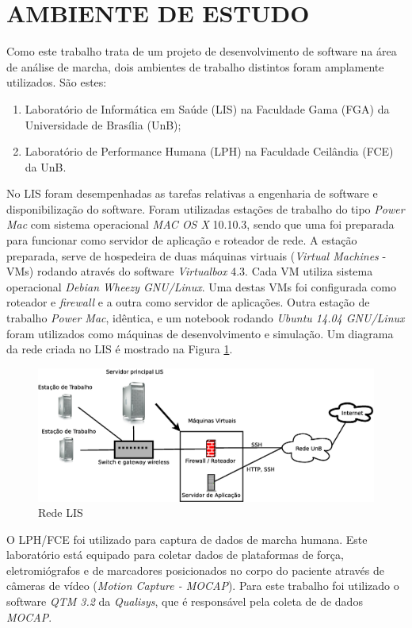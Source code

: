 \section[AMBIENTE DE ESTUDO]{AMBIENTE DE ESTUDO}

Como este trabalho trata de um projeto de desenvolvimento de software na área de análise de marcha, dois ambientes de trabalho distintos foram amplamente utilizados. São estes:

\begin{enumerate}
	\item Laboratório de Informática em Saúde (LIS) na Faculdade Gama (FGA) da Universidade de Brasília (UnB);
	\item Laboratório de Performance Humana (LPH) na Faculdade Ceilândia (FCE) da UnB.
\end{enumerate}

No LIS foram desempenhadas as tarefas relativas a engenharia de software e disponibilização do software.
Foram utilizadas estações de trabalho do tipo \emph{Power Mac} com sistema operacional \emph{MAC OS X} 10.10.3, sendo que uma foi preparada para funcionar como servidor de aplicação e roteador de rede. 
A estação preparada, serve de hospedeira de duas máquinas virtuais (\emph{Virtual Machines} - VMs) rodando através do software \emph{Virtualbox} 4.3. 
Cada VM utiliza sistema operacional \emph{Debian Wheezy GNU/Linux}. 
Uma destas VMs foi configurada como roteador e \emph{firewall} e a outra como servidor de aplicações.  
Outra estação de trabalho \emph{Power Mac}, idêntica, e um notebook rodando \emph{Ubuntu 14.04 GNU/Linux} foram utilizados como máquinas de desenvolvimento e simulação.
Um diagrama da rede criada no LIS é mostrado na Figura \ref{lis_rede}.

\begin{figure}[ht]
	\centering
	\includegraphics[width=15cm]{figuras/lis_rede.eps}
	\caption{Rede LIS}
	\label{lis_rede}
\end{figure}

O LPH/FCE foi utilizado para captura de dados de marcha humana. 
Este laboratório está equipado para coletar dados de plataformas de força, eletromiógrafos e de marcadores posicionados no corpo do paciente através de câmeras de vídeo (\emph{Motion Capture - MOCAP}). 
Para este trabalho foi utilizado o software \emph{QTM 3.2} da \emph{Qualisys}, que é responsável pela coleta de de dados \emph{MOCAP}. 
